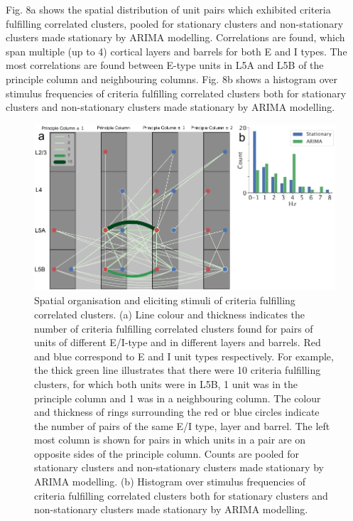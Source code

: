 \documentclass{article}
\begin{document}
Fig. 8a shows the spatial distribution of unit pairs which exhibited criteria fulfilling correlated clusters, pooled for stationary clusters and non-stationary clusters made stationary by ARIMA modelling. Correlations are found, which span multiple (up to 4) cortical layers and barrels for both E and I types. The most correlations are found between E-type units in L5A and L5B of the principle column and neighbouring columns. Fig. 8b shows a histogram over stimulus frequencies of criteria fulfilling correlated clusters both for stationary clusters and non-stationary clusters made stationary by ARIMA modelling. 

\begin{figure}[t!]
\centering
\includegraphics[width=\textwidth]{Figure8.pdf}
\caption{Spatial organisation and eliciting stimuli of criteria fulfilling correlated clusters. (a) Line colour and thickness indicates the number of criteria fulfilling correlated clusters found for pairs of units of different E/I-type and in different layers and barrels. Red and blue correspond to E and I unit types respectively. For example, the thick green line illustrates that there were 10 criteria fulfilling clusters, for which both units were in L5B, 1 unit was in the principle column and 1 was in a neighbouring column. The colour and thickness of rings surrounding the red or blue circles indicate the number of pairs of the same E/I type, layer and barrel. The left most column is shown for pairs in which units in a pair are on opposite sides of the principle column. Counts are pooled for stationary clusters and non-stationary clusters made stationary by ARIMA modelling. (b) Histogram over stimulus frequencies of criteria fulfilling correlated clusters both for stationary clusters and non-stationary clusters made stationary by ARIMA modelling.}
\label{fig:universe}
\end{figure}
\end{document}
